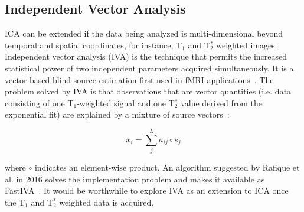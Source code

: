 \subsection{Independent Vector Analysis}

\acs{ICA} can be extended if the data being analyzed is multi-dimensional beyond temporal and spatial coordinates, for instance, T$_1$ and T$_2^*$ weighted images.
Independent vector analysis (\acs{IVA}) is the technique that permits the increased statistical power of two independent parameters acquired simultaneously.
It is a vector-based blind-source estimation first used in \acs{fMRI} applications~\cite{Lee:2008dc}. 
The problem solved by \acs{IVA} is that observations that are vector quantities (i.e. data consisting of one T$_1$-weighted signal and one T$_2^*$ value derived from the exponential fit) are explained by a mixture of source vectors~\cite{Lee:2008dc}:

\begin{equation}
x_i = \sum_{j}^{L} a_{ij} \circ s_j
\end{equation}

where $\circ$ indicates an element-wise product. 
An algorithm suggested by Rafique et al. in 2016 solves the implementation problem and makes it available as FastIVA~\cite{Rafique:2016cf}.
It would be worthwhile to explore \acs{IVA} as an extension to \acs{ICA} once the T$_1$ and T$_2^*$ weighted data is acquired.






\endinput